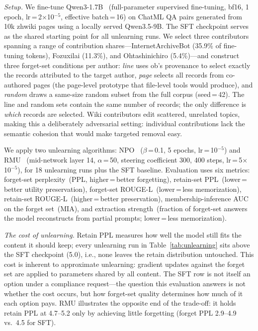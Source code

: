\emph{Setup.} We fine-tune Qwen3-1.7B~\cite{qwen3_2025} (full-parameter supervised fine-tuning, bf16, 1 epoch, lr\,=\,2$\times$10$^{-5}$, effective batch\,=\,16) on ChatML QA pairs generated from 10k zhwiki pages using a locally served Qwen3.5-9B. The SFT checkpoint serves as the shared starting point for all unlearning runs. We select three contributors spanning a range of contribution shares---InternetArchiveBot (35.9\% of fine-tuning tokens), Fozuxilai (11.3\%), and Ohtashinichiro (5.4\%)---and construct three forget-set conditions per author: \emph{line} uses ob's provenance to select exactly the records attributed to the target author, \emph{page} selects all records from co-authored pages (the page-level prototype that file-level tools would produce), and \emph{random} draws a same-size random subset from the full corpus (seed\,=\,42). The line and random sets contain the same number of records; the only difference is \emph{which} records are selected. Wiki contributors edit scattered, unrelated topics, making this a deliberately adversarial setting: individual contributions lack the semantic cohesion that would make targeted removal easy.

We apply two unlearning algorithms: NPO~\cite{zhang2024npo} ($\beta$\,=\,0.1, 5 epochs, lr\,=\,10$^{-5}$) and RMU~\cite{li2024wmdp} (mid-network layer 14, $\alpha$\,=\,50, steering coefficient 300, 400 steps, lr\,=\,5$\times$10$^{-5}$), for 18 unlearning runs plus the SFT baseline. Evaluation uses six metrics: forget-set perplexity~(PPL, higher\,=\,better forgetting), retain-set PPL~(lower\,=\,better utility preservation), forget-set ROUGE-L~(lower\,=\,less memorization), retain-set ROUGE-L~(higher\,=\,better preservation), membership-inference AUC on the forget set~(MIA), and extraction strength~(fraction of forget-set answers the model reconstructs from partial prompts; lower\,=\,less memorization).



\emph{The cost of unlearning.} Retain PPL measures how well the model still fits the content it should keep; every unlearning run in Table~\ref{tab:unlearning} sits above the SFT checkpoint (5.0), i.e., none leaves the retain distribution untouched. This cost is inherent to approximate unlearning: gradient updates against the forget set are applied to parameters shared by all content. The SFT row is not itself an option under a compliance request---the question this evaluation answers is not whether the cost occurs, but how forget-set quality determines how much of it each option pays. RMU illustrates the opposite end of the trade-off: it holds retain PPL at 4.7--5.2 only by achieving little forgetting (forget PPL 2.9--4.9 vs.\ 4.5 for SFT).

